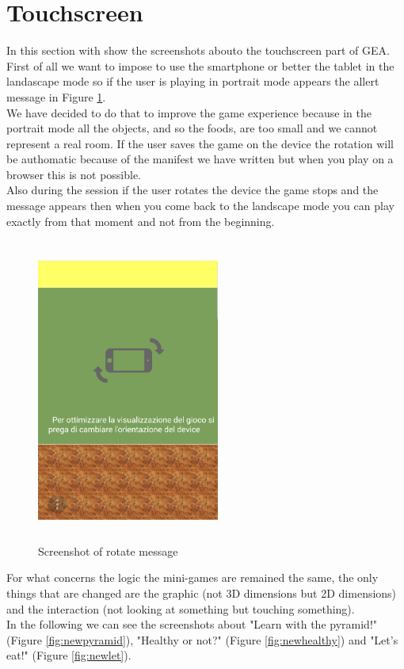 \section{Touchscreen}
In this section with show the screenshots abouto the touchscreen part of GEA.\\
First of all we want to impose to use the smartphone or better the tablet in the landascape mode so if the user is playing in portrait mode appears the allert message in Figure \ref{fig:rotate}.\\
We have decided to do that to improve the game experience because in the portrait mode all the objects, and so the foods, are too small and we cannot represent a real room. If the user saves the game on the device the rotation will be authomatic because of the manifest we have written but when you play on a browser this is not possible.\\
Also during the session if the user rotates the device the game stops and the message appears then when you come back to the landscape mode you can play exactly from that moment and not from the beginning.
\newpage
\begin{figure}[H]
\centering
\includegraphics[width=6cm, height=10cm]{immagini/rotate.png}
\caption{Screenshot of rotate message}\label{fig:rotate}
\end{figure}
For what concerns the logic the mini-games are remained the same, the only things that are changed are the graphic (not 3D dimensions but 2D dimensions) and the interaction (not looking at something but touching something).\\
In the following we can see the screenshots about "Learn with the pyramid!" (Figure \ref{fig:newpyramid}), "Healthy or not?" (Figure \ref{fig:newhealthy}) and "Let's eat!" (Figure \ref{fig:newlet}).
